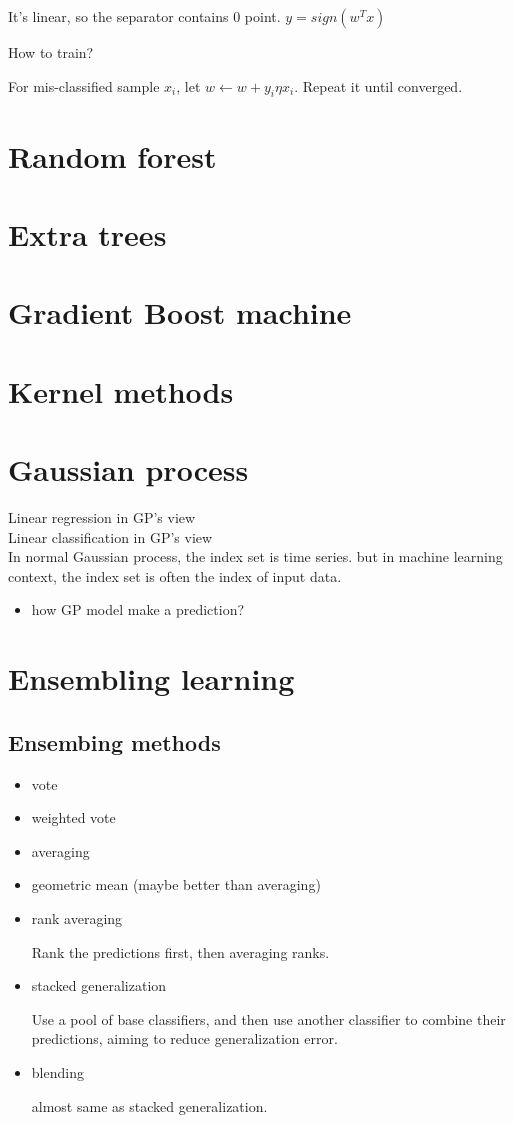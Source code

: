 \documentclass[10pt,a4paper]{book}
\begin{document}
It's linear, so the separator contains 0 point. $y=sign(w^Tx)$

How to train?

For mis-classified sample $x_i$, let $w \leftarrow w + y_i \eta x_i$. Repeat it until converged. 

\section {Random forest}
\section {Extra trees}
\section {Gradient Boost machine}

\section {Kernel methods}

\section{Gaussian process}

Linear regression in GP's view
\\
Linear classification in GP's view
\\
In normal Gaussian process, the index set is time series. but in machine learning context, the index set is often the index of input data.

\begin{itemize}
	\item how GP model make a prediction?
\end{itemize}

\section {Ensembling learning}
\subsection{Ensembing methods}
\begin{itemize}
	\item vote
	\item weighted vote
	\item averaging
	\item geometric mean (maybe better than averaging)
	\item rank averaging
	
	 Rank the predictions first, then averaging ranks. 
	\item stacked generalization
	
	 Use a pool of base classifiers, and then use another classifier to combine their predictions, aiming to reduce generalization error.
	\item blending
	
	almost same as stacked generalization. 
	
\end{itemize}
\end{document}
